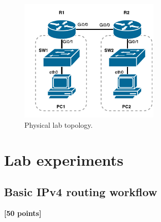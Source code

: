 \documentclass[pdftex,12pt,a4paper]{article}
\begin{document}
        \begin{figure}[tbh]
            \centering
            \includegraphics[width=0.6\textwidth]{figures/labtop}
            \caption{Physical lab topology.}
            \label{fig:labtop}
        \end{figure}

    \section{Lab experiments}
        \subsection{Basic IPv4 routing workflow}
            \begin{flushright}
                \textbf{[50 points]}
            \end{flushright}
\end{document}
